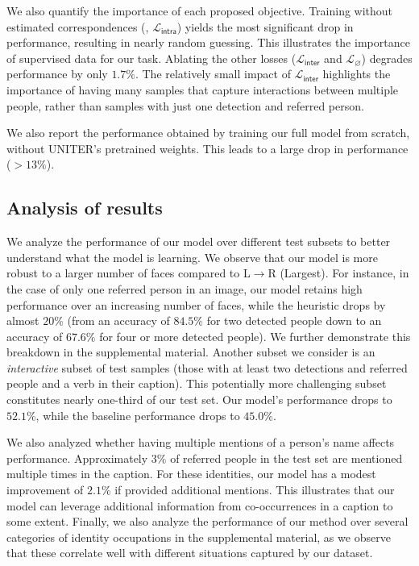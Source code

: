 We also quantify the importance of each proposed objective. Training without estimated correspondences (\ie, $\mathcal{L}_\mathsf{intra}$) yields the most significant drop in performance, resulting in nearly random guessing. This illustrates the importance of supervised data for our task. Ablating the other losses ($\mathcal{L}_\mathsf{inter}$ and $\mathcal{L}_\mathsf{\varnothing}$) degrades performance by only $1.7\%$. The relatively small impact of $\mathcal{L}_\mathsf{inter}$ highlights the importance of having many samples that capture interactions between multiple people, rather than samples with just one detection and referred person.

We also report the performance obtained by training our full model 
from scratch, without UNITER's pretrained weights. This leads to a large drop in performance ($>13\%$). 


\subsection{Analysis of results}

We analyze the performance of our model over different test subsets to better understand what the model is learning. 
We observe that our model is more robust to a larger number of faces compared to L$\rightarrow$R (Largest). For instance, in the case of only one referred person in an image, our model retains high performance over an increasing number of faces, while the heuristic drops by almost $20\%$ (from an accuracy of $84.5\%$ for two detected people down to an accuracy of $67.6\%$ for four or more detected people). We further demonstrate this breakdown in the supplemental material.
Another subset we consider is an \emph{interactive} subset of test samples (\ie those with at least two detections and referred people and a verb in their caption). 
This potentially more challenging subset constitutes nearly one-third of our test set.
Our model's performance drops to $52.1\%$, while the baseline performance drops to $45.0\%$.

We also analyzed whether having multiple mentions of a person's name affects performance. Approximately $3\%$ of referred people in the test set are mentioned multiple times in the caption. For these identities, our model has a modest improvement of $2.1\%$ if provided additional mentions. This illustrates that our model can leverage additional information from co-occurrences in a caption to some extent.
Finally, we also analyze the performance of our method over several categories of identity occupations in the supplemental material, as we observe that these correlate well with different situations captured by our dataset.

